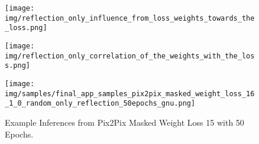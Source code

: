		\begin{figure}[H]
			\centering
			\texttt{[image: img/reflection\_only\_influence\_from\_loss\_weights\_towards\_the\_loss.png]}
			\caption[]{}
			\label{fig:experiment_reflection_only_influence}
		\end{figure}
		\FloatBarrier
		
		\begin{figure}[H]
			\centering
			\texttt{[image: img/reflection\_only\_correlation\_of\_the\_weights\_with\_the\_loss.png]}
			\caption[]{}
			\label{fig:experiment_reflection_only_correlation}
		\end{figure}
		\FloatBarrier
		
		\begin{figure}[H]
			\centering
			\texttt{[image: img/samples/final\_app\_samples\_pix2pix\_masked\_weight\_loss\_16\_1\_0\_random\_only\_reflection\_50epochs\_gnu.png]}
			\caption[Example Inferences from Pix2Pix Masked Weight Loss 15 with 50 Epochs.]{Example Inferences from Pix2Pix Masked Weight Loss 15 with 50 Epochs.}
			\label{fig:experiment_reflection_only_pix2pix_examples}
		\end{figure}
		\FloatBarrier
		
	
	
	

